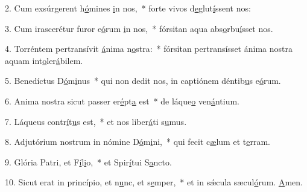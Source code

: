 2. Cum exsúrgerent h\uline{ó}mines \uline{i}n nos,~* forte vivos d\uline{e}glut\uline{í}ssent nos:\par 
3. Cum irascerétur furor e\uline{ó}rum \uline{i}n nos,~* fórsitan aqua abs\uline{o}rbu\uline{í}sset nos.\par 
4. Torréntem pertransívit \uline{á}nima n\uline{o}stra:~* fórsitan pertransísset ánima nostra aquam int\uline{o}ler\uline{á}bilem.\par 
5. Benedíctus D\uline{ó}m\uline{i}nus~* qui non dedit nos, in captiónem déntib\uline{u}s e\uline{ó}rum.\par 
6. Anima nostra sicut passer er\uline{é}pt\uline{a} est~* de láque\uline{o} ven\uline{á}ntium.\par 
7. Láqueus contr\uline{í}t\uline{u}s est,~* et nos liber\uline{á}ti s\uline{u}mus.\par 
8. Adjutórium nostrum in nómine D\uline{ó}m\uline{i}ni,~* qui fecit c\uline{æ}lum et t\uline{e}rram.\par 
9. Glória Patri, et F\uline{í}l\uline{i}o,~* et Spir\uline{í}tui S\uline{a}ncto.\par 
10. Sicut erat in princípio, et n\uline{u}nc, et s\uline{e}mper,~* et in sǽcula sæcul\uline{ó}rum. \uline{A}men.\par 
